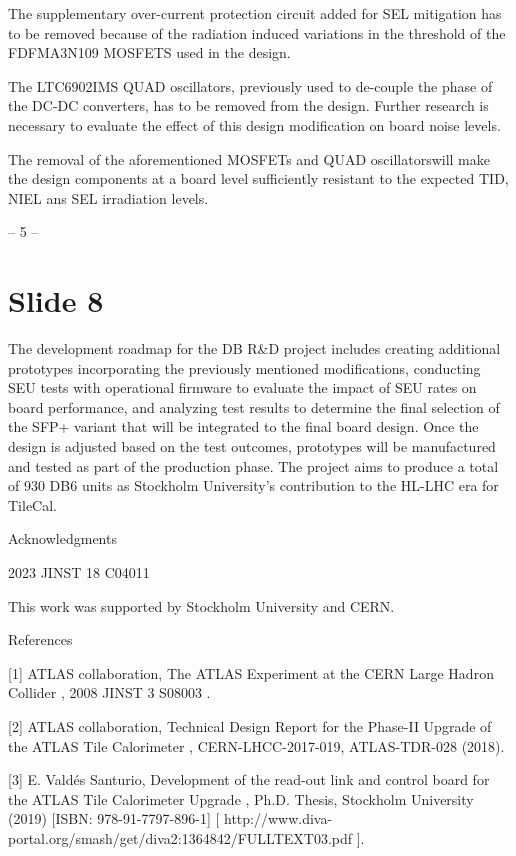 \documentclass{article}
\begin{document}
   The supplementary over-current protection circuit added for SEL mitigation has to be removed 
because of the radiation induced variations in the threshold of the FDFMA3N109 MOSFETS 
used in the design.

   The LTC6902IMS QUAD oscillators, previously used to de-couple the phase of the DC-DC 
converters, has to be removed from the design.   Further research is necessary to evaluate the 
effect of this design modification on board noise levels.

The removal of the aforementioned MOSFETs and QUAD oscillatorswill make the design components 
at a board level sufficiently resistant to the expected TID, NIEL ans SEL irradiation levels.

-- 5 --

\section*{Slide 8}

The development roadmap for the DB R\&D project includes creating additional prototypes 
incorporating   the   previously   mentioned   modifications,   conducting   SEU   tests   with   operational 
firmware to evaluate the impact of SEU rates on board performance, and analyzing test results to 
determine the final selection of the SFP+ variant that will be integrated to the final board design. 
Once the design is adjusted based on the test outcomes, prototypes will be manufactured and tested 
as part of the production phase.   The project aims to produce a total of 930 DB6 units as Stockholm 
University's contribution to the HL-LHC era for TileCal.

Acknowledgments

2023 JINST 18 C04011

This work was supported by Stockholm University and CERN.

References

[1]   ATLAS collaboration,  The ATLAS Experiment at the CERN Large Hadron Collider ,  2008  JINST   3 
S08003 .

[2]   ATLAS collaboration,  Technical Design Report for the Phase-II Upgrade of the ATLAS Tile 
Calorimeter ,  CERN-LHCC-2017-019, ATLAS-TDR-028  (2018).

[3]   E. Vald\'es Santurio,  Development of the read-out link and control board for the ATLAS Tile Calorimeter 
Upgrade , Ph.D. Thesis, Stockholm University (2019) [ISBN: 978-91-7797-896-1] 
[ http://www.diva-portal.org/smash/get/diva2:1364842/FULLTEXT03.pdf ].
\end{document}
